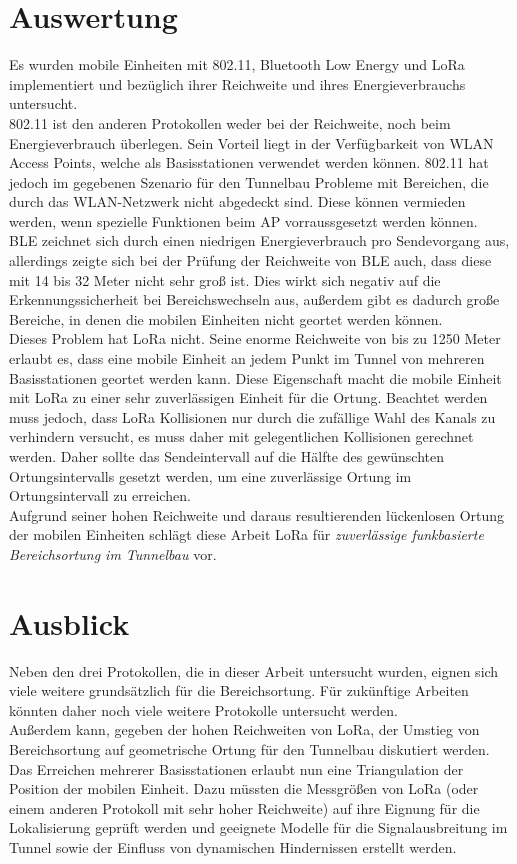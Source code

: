 \section{Auswertung}
Es wurden mobile Einheiten mit 802.11, Bluetooth Low Energy und LoRa implementiert und bezüglich ihrer Reichweite und ihres Energieverbrauchs untersucht.\\
802.11 ist den anderen Protokollen weder bei der Reichweite, noch beim Energieverbrauch überlegen. 
Sein Vorteil liegt in der Verfügbarkeit von WLAN Access Points, welche als Basisstationen verwendet werden können.
802.11 hat jedoch im gegebenen Szenario für den Tunnelbau Probleme mit Bereichen, die durch das WLAN-Netzwerk nicht abgedeckt sind. 
Diese können vermieden werden, wenn spezielle Funktionen beim AP vorraussgesetzt werden können.\\
BLE zeichnet sich durch einen niedrigen Energieverbrauch pro Sendevorgang aus, allerdings zeigte sich bei der Prüfung der Reichweite von BLE auch, dass diese mit 14 bis 32 Meter nicht sehr groß ist.
Dies wirkt sich negativ auf die Erkennungssicherheit bei Bereichswechseln aus, außerdem gibt es dadurch große Bereiche, in denen die mobilen Einheiten nicht geortet werden können.\\
Dieses Problem hat LoRa nicht. 
Seine enorme Reichweite von bis zu 1250 Meter erlaubt es, dass eine mobile Einheit an jedem Punkt im Tunnel von mehreren Basisstationen geortet werden kann.
Diese Eigenschaft macht die mobile Einheit mit LoRa zu einer sehr zuverlässigen Einheit für die Ortung.
Beachtet werden muss jedoch, dass LoRa Kollisionen nur durch die zufällige Wahl des Kanals zu verhindern versucht, es muss daher mit gelegentlichen Kollisionen gerechnet werden.
Daher sollte das Sendeintervall auf die Hälfte des gewünschten Ortungsintervalls gesetzt werden, um eine zuverlässige Ortung im Ortungsintervall zu erreichen.\\
Aufgrund seiner hohen Reichweite und daraus resultierenden lückenlosen Ortung der mobilen Einheiten schlägt diese Arbeit LoRa für \emph{zuverlässige funkbasierte Bereichsortung im Tunnelbau} vor.

\section{Ausblick}
Neben den drei Protokollen, die in dieser Arbeit untersucht wurden, eignen sich viele weitere grundsätzlich für die Bereichsortung.
Für zukünftige Arbeiten könnten daher noch viele weitere Protokolle untersucht werden. \\
Außerdem kann, gegeben der hohen Reichweiten von LoRa, der Umstieg von Bereichsortung auf geometrische Ortung für den Tunnelbau diskutiert werden. 
Das Erreichen mehrerer Basisstationen erlaubt nun eine Triangulation der Position der mobilen Einheit.
Dazu müssten die Messgrößen von LoRa (oder einem anderen Protokoll mit sehr hoher Reichweite) auf ihre Eignung für die Lokalisierung geprüft werden und geeignete Modelle für die Signalausbreitung im Tunnel sowie der Einfluss von dynamischen Hindernissen erstellt werden.

